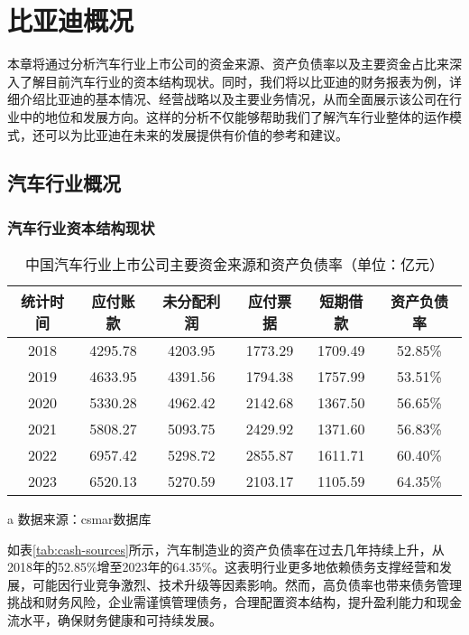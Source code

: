 \chapter{比亚迪概况}
本章将通过分析汽车行业上市公司的资金来源、资产负债率以及主要资金占比来深入了解目前汽车行业的资本结构现状。同时，我们将以比亚迪的财务报表为例，详细介绍比亚迪的基本情况、经营战略以及主要业务情况，从而全面展示该公司在行业中的地位和发展方向。这样的分析不仅能够帮助我们了解汽车行业整体的运作模式，还可以为比亚迪在未来的发展提供有价值的参考和建议。
\section{汽车行业概况}

\subsection{汽车行业资本结构现状}
\begin{table}
  \centering
  \begin{threeparttable}[c]
    \caption{中国汽车行业上市公司主要资金来源和资产负债率（单位：亿元）}
    \label{tab:cash-sources}
    \begin{tabular}{cccccc}
      \toprule
        统计时间 & 应付账款 & 未分配利润 & 应付票据 & 短期借款 & 资产负债率 \\ 
      \midrule
        2018 & 4295.78  & 4203.95  & 1773.29  & 1709.49  & 52.85\% \\ 
        2019 & 4633.95  & 4391.56  & 1794.38  & 1757.99  & 53.51\% \\ 
        2020 & 5330.28  & 4962.42  & 2142.68  & 1367.50  & 56.65\% \\ 
        2021 & 5808.27  & 5093.75  & 2429.92  & 1371.60  & 56.83\% \\ 
        2022 & 6957.42  & 5298.72  & 2855.87  & 1611.71  & 60.40\% \\ 
        2023 & 6520.13  & 5270.59  & 2103.17  & 1105.59  & 64.35\% \\ 
      \bottomrule
    \end{tabular}
    \begin{tablenotes}
      \item [a] 数据来源：csmar数据库
    \end{tablenotes}
  \end{threeparttable}
\end{table}
如表\eqref{tab:cash-sources}所示，汽车制造业的资产负债率在过去几年持续上升，从2018年的52.85\%增至2023年的64.35\%。这表明行业更多地依赖债务支撑经营和发展，可能因行业竞争激烈、技术升级等因素影响。然而，高负债率也带来债务管理挑战和财务风险，企业需谨慎管理债务，合理配置资本结构，提升盈利能力和现金流水平，确保财务健康和可持续发展。

